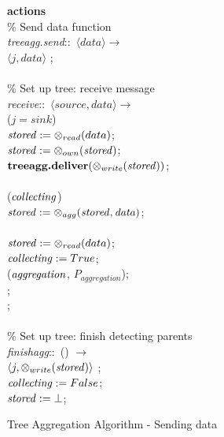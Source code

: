 \begin{figure}[H]
  \centering
  \begin{boxedminipage}{\linewidth}
    \null \textbf{actions}\\
    \null\qq \% Send data function\\
    \null\qq \emph{treeagg.send}::~$\langle data\rangle \rightarrow$\\
    \null\qq\qq {}$\langle j, data\rangle$  ;\\~\\
    \null\qq \% Set up tree: receive message\\
    \null\qq \emph{receive}::~$\langle source, data\rangle \rightarrow$\\
    \null\qq\qq {} ($j = sink$)  \\
    \null\qq\qq\qq $\mbox{\emph{stored}} \mathrel{:=} \otimes_{read}(data)$; \\
    \null\qq\qq\qq $\mbox{\emph{stored}} \mathrel{:=} \otimes_{own}(\mbox{\emph{stored}})$; \\
    \null\qq\qq\qq $\mbox{\textbf{treeagg.deliver}}(\otimes_{write}(\mbox{\emph{stored}}))$; \\
    \null\qq\qq {} \\
    \null\qq\qq\qq {} ($\mbox{\emph{collecting}}$)  \\
    \null\qq\qq\qq\qq $\mbox{\emph{stored}} \mathrel{:=} \otimes_{agg}(\mbox{\emph{stored}}, \mbox{\emph{data}})$; \\
    \null\qq\qq\qq {} \\
    \null\qq\qq\qq\qq $\mbox{\emph{stored}} \mathrel{:=} \otimes_{read}(data)$; \\
    \null\qq\qq\qq\qq $\mbox{\emph{collecting}} \mathrel{:=} True$; \\
    \null\qq\qq\qq\qq {}($\mbox{\emph{aggregation}}$, $P_{aggregation}$); \\
    \null\qq\qq\qq {}; \\
    \null\qq\qq {}; \\~\\
    \null\qq \% Set up tree: finish detecting parents\\
    \null\qq \emph{finishagg}::~() $\rightarrow$\\
    \null\qq\qq {}$\langle j, \otimes_{write}(\mbox{\emph{stored}})\rangle$  ;\\
    \null\qq\qq $\mbox{\emph{collecting}} \mathrel{:=} False$; \\
    \null\qq\qq $\mbox{\emph{stored}} \mathrel{:=} \bot$;
  \end{boxedminipage}
  \caption{Tree Aggregation Algorithm - Sending data}
\end{figure}

